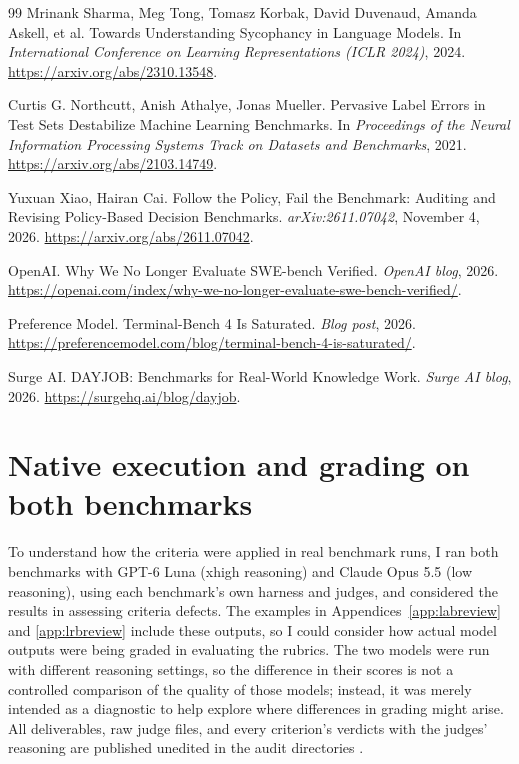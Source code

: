 \documentclass[11pt]{article}
\begin{document}
\begin{thebibliography}{99}
 Mrinank Sharma, Meg Tong, Tomasz Korbak, David Duvenaud, Amanda Askell, et al. Towards Understanding Sycophancy in Language Models. In \emph{International Conference on Learning Representations (ICLR 2024)}, 2024. \url{https://arxiv.org/abs/2310.13548}.

 Curtis G. Northcutt, Anish Athalye, Jonas Mueller. Pervasive Label Errors in Test Sets Destabilize Machine Learning Benchmarks. In \emph{Proceedings of the Neural Information Processing Systems Track on Datasets and Benchmarks}, 2021. \url{https://arxiv.org/abs/2103.14749}.

 Yuxuan Xiao, Hairan Cai. Follow the Policy, Fail the Benchmark: Auditing and Revising Policy-Based Decision Benchmarks. \emph{arXiv:2611.07042}, November 4, 2026. \url{https://arxiv.org/abs/2611.07042}.

 OpenAI. Why We No Longer Evaluate SWE-bench Verified. \emph{OpenAI blog}, 2026. \url{https://openai.com/index/why-we-no-longer-evaluate-swe-bench-verified/}.

 Preference Model. Terminal-Bench 4 Is Saturated. \emph{Blog post}, 2026. \url{https://preferencemodel.com/blog/terminal-bench-4-is-saturated/}.

 Surge AI. DAYJOB: Benchmarks for Real-World Knowledge Work. \emph{Surge AI blog}, 2026. \url{https://surgehq.ai/blog/dayjob}.

\end{thebibliography}

\clearpage

\appendix
\section{Native execution and grading on both benchmarks}
\label{app:native}
To understand how the criteria were applied in real benchmark runs, I ran both benchmarks with GPT-6 Luna (xhigh reasoning) and Claude Opus 5.5 (low reasoning), using each benchmark's own harness and judges, and considered the results in assessing criteria defects. The examples in Appendices~\ref{app:labreview} and \ref{app:lrbreview} include these outputs, so I could consider how actual model outputs were being graded in evaluating the rubrics. The two models were run with different reasoning settings, so the difference in their scores is not a controlled comparison of the quality of those models; instead, it was merely intended as a diagnostic to help explore where differences in grading might arise. All deliverables, raw judge files, and every criterion's verdicts with the judges' reasoning are published unedited in the audit directories \citep{labaudit,lrbaudit}.
\end{document}
